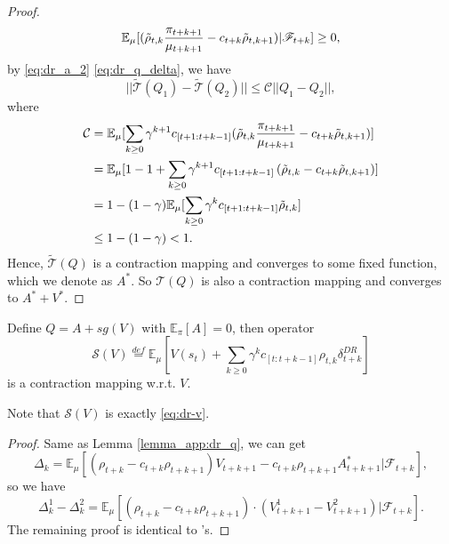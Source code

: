 \begin{proof}
$$
\mathbb{E}_{\mu}[
(
\Tilde{\rho}_{t, k} \frac{\pi_{t+k+1}}{\mu_{t+k+1}}- c_{t+k} \Tilde{\rho}_{t, k+1} 
) | \mathscr{F}_{t+k}
] \geq 0,
$$
by \eqref{eq:dr_a_2} \eqref{eq:dr_q_delta}, we have 
$$
        || \widetilde{\mathscr{T}}(Q_1) - \widetilde{\mathscr{T}}(Q_2) || 
        \leq \mathcal{C} || Q_1 - Q_2 ||,
$$
where 
$$
    \begin{aligned}
        \mathcal{C} 
        &= \mathbb{E}_{\mu} [ \sum_{k \geq 0}  \gamma^{k+1} c_{[t+1:t+k-1]} 
        (
        \Tilde{\rho}_{t, k} \frac{\pi_{t+k+1}}{\mu_{t+k+1}}- c_{t+k} \Tilde{\rho}_{t, k+1} 
        ) ]
        \\
        &= \mathbb{E}_{\mu} [1 -1 + \sum_{k \geq 0}  \gamma^{k+1} c_{[t+1:t+k-1]} 
        \left(
        \Tilde{\rho}_{t, k} - c_{t+k} \Tilde{\rho}_{t, k+1} 
        \right) ] 
        \\
        &= 1 - (1 - \gamma)  \mathbb{E}_{\mu} [\sum_{k \geq 0} \gamma^{k}c_{[t+1:t+k-1]} \Tilde{\rho}_{t, k}  ] \\
        &\leq 1 - (1 - \gamma) < 1.
    \end{aligned}
$$
Hence, $\widetilde{\mathscr{T}}(Q)$ is a contraction mapping and converges to some fixed function, which we denote as $A^*$. So $\mathscr{T}(Q)$ is also a contraction mapping and converges to $A^*+V^*$.
\end{proof}

\begin{Lemma_app}
Define $Q = A + sg(V)$ with $\mathbb{E}_\pi [A] = 0$,
then operator 
$$
    \mathscr{S}(V) \overset{def}{=} \mathbb{E}_{\mu}  [
        V(s_t) + \sum_{k \geq 0}  \gamma^k
        c_{[t:t+k-1]} \rho_{t, k}
        \delta^{DR}_{t+k}
        ]
$$
is a contraction mapping w.r.t. $V$.
\label{lemma_app:dr_v}
\end{Lemma_app}
\begin{Remark_app}
Note that $\mathscr{S}(V)$ is exactly \eqref{eq:dr-v}. 
\end{Remark_app}
\begin{proof}

Same as Lemma \ref{lemma_app:dr_q}, we can get
$$
    \Delta_k = \mathbb{E}_{\mu}\left[
    \left( \rho_{t+k} - c_{t+k} \rho_{t+k+1}\right) V_{t+k+1} 
     -  c_{t+k} \rho_{t+k+1} A^*_{t+k+1} | \mathscr{F}_{t+k}\right],
$$
so we have 
$$
    \Delta^1_k - \Delta^2_k = \mathbb{E}_{\mu}\left[ 
    \left( \rho_{t+k} - c_{t+k} \rho_{t+k+1}\right) \cdot  
   (V^1_{t+k+1} -  V^2_{t+k+1})
     | \mathscr{F}_{t+k}\right].
$$
The remaining proof is identical to \citep{impala}'s.
\end{proof}

